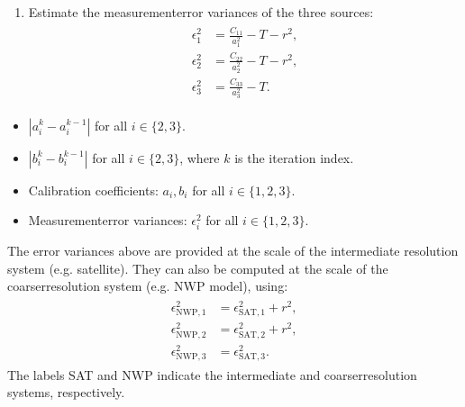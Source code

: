 \documentclass[a4paper,10pt,english]{sphinxmanual}
\begin{document}
\begin{enumerate}
\item {} 
\sphinxAtStartPar
Estimate the measurement\sphinxhyphen{}error variances of the three sources:
\begin{equation}\label{equation:alg-02-validation:eq-cvtdd-tc-error-variances}
\begin{split}\begin{aligned}
\epsilon_1^2 &= \frac{C_{11}}{a_1^2}-T-r^2, \\
\epsilon_2^2 &= \frac{C_{22}}{a_2^2}-T-r^2, \\
\epsilon_3^2 &= \frac{C_{33}}{a_3^2}-T .
\end{aligned}\end{split}
\end{equation}
\end{enumerate}

\sphinxAtStartPar
{}
\begin{itemize}
\item {} 
\sphinxAtStartPar
\(\left|a_i^k-a_i^{k-1}\right|\) for all \(i\in\{2,3\}\).

\item {} 
\sphinxAtStartPar
\(\left|b_i^k-b_i^{k-1}\right|\) for all \(i\in\{2,3\}\), where
\(k\) is the iteration index.

\end{itemize}

\sphinxAtStartPar
{}
\begin{itemize}
\item {} 
\sphinxAtStartPar
Calibration coefficients: \(a_i,b_i\) for all \(i\in\{1,2,3\}\).

\item {} 
\sphinxAtStartPar
Measurement\sphinxhyphen{}error variances: \(\epsilon_i^2\) for all
\(i\in\{1,2,3\}\).

\end{itemize}

\sphinxAtStartPar
The error variances above are provided at the scale of the intermediate
resolution system (e.g. satellite). They can also be computed at the scale of
the coarser\sphinxhyphen{}resolution system (e.g. NWP model), using:
\begin{equation}\label{equation:alg-02-validation:eq-cvtdd-tc-nwp-error-variances}
\begin{split}\begin{aligned}
\epsilon_{\mathrm{NWP},1}^{2}
  &= \epsilon_{\mathrm{SAT},1}^{2}+r^{2}, \\
\epsilon_{\mathrm{NWP},2}^{2}
  &= \epsilon_{\mathrm{SAT},2}^{2}+r^{2}, \\
\epsilon_{\mathrm{NWP},3}^{2}
  &= \epsilon_{\mathrm{SAT},3}^{2}.
\end{aligned}\end{split}
\end{equation}
\sphinxAtStartPar
The labels SAT and NWP indicate the intermediate\sphinxhyphen{} and coarser\sphinxhyphen{}resolution
systems, respectively.
\end{document}
